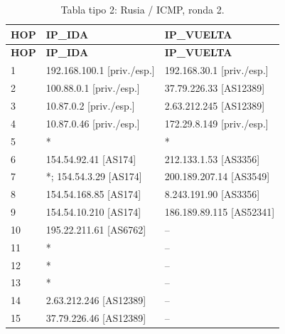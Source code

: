 \endgroup
\begingroup
\fontsize{9}{11}\selectfont
\begin{longtable}{p{0.95cm}p{7.075cm}p{7.075cm}}
\caption{Tabla tipo 2: Rusia / ICMP, ronda 2.}\label{tabla2:37.79.226.46:ICMP} \\
\toprule
\textbf{HOP} & \textbf{IP\_\allowbreak{}IDA} & \textbf{IP\_\allowbreak{}VUELTA} \\ \midrule
\endfirsthead
\toprule
\textbf{HOP} & \textbf{IP\_\allowbreak{}IDA} & \textbf{IP\_\allowbreak{}VUELTA} \\ \midrule
\endhead
1 & 192.168.100.1 [priv./esp.] & 192.168.30.1 [priv./esp.] \\
2 & 100.88.0.1 [priv./esp.] & 37.79.226.33 [AS12389] \\
3 & 10.87.0.2 [priv./esp.] & 2.63.212.245 [AS12389] \\
4 & 10.87.0.46 [priv./esp.] & 172.29.8.149 [priv./esp.] \\
5 & * & * \\
6 & 154.54.92.41 [AS174] & 212.133.1.53 [AS3356] \\
7 & *; 154.54.3.29 [AS174] & 200.189.207.14 [AS3549] \\
8 & 154.54.168.85 [AS174] & 8.243.191.90 [AS3356] \\
9 & 154.54.10.210 [AS174] & 186.189.89.115 [AS52341] \\
10 & 195.22.211.61 [AS6762] & -- \\
11 & * & -- \\
12 & * & -- \\
13 & * & -- \\
14 & 2.63.212.246 [AS12389] & -- \\
15 & 37.79.226.46 [AS12389] & -- \\
\bottomrule
\end{longtable}
\endgroup
\begingroup
\fontsize{9}{11}\selectfont
